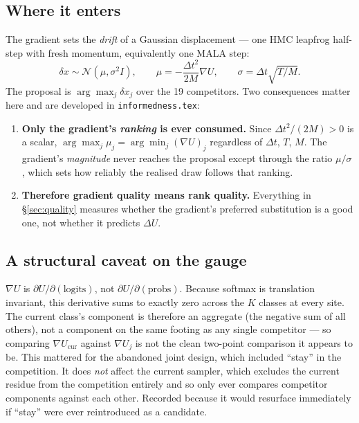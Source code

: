 \documentclass[11pt,a4paper]{article}
\newcommand{\dt}{\Delta t}
\newcommand{\gradU}{\nabla U}
\newcommand{\Mass}{M}
\begin{document}
\subsection{Where it enters}

The gradient sets the \emph{drift} of a Gaussian displacement --- one HMC
leapfrog half-step with fresh momentum, equivalently one MALA step:
\begin{equation}
  \delta x \sim \mathcal{N}(\mu, \sigma^{2}I),
  \qquad
  \mu = -\frac{\dt^{2}}{2\Mass}\gradU,
  \qquad
  \sigma = \dt\sqrt{T/\Mass}.
\end{equation}
The proposal is $\arg\max_{j}\delta x_{j}$ over the 19 competitors. Two
consequences matter here and are developed in \texttt{informedness.tex}:

\begin{enumerate}
  \item \textbf{Only the gradient's \emph{ranking} is ever consumed.} Since
        $\dt^{2}/(2\Mass)>0$ is a scalar, $\arg\max_{j}\mu_{j} =
        \arg\min_{j}(\gradU)_{j}$ regardless of $\dt$, $T$, $\Mass$. The
        gradient's \emph{magnitude} never reaches the proposal except through
        the ratio $\mu/\sigma$, which sets how reliably the realised draw
        follows that ranking.
  \item \textbf{Therefore gradient quality means rank quality.} Everything in
        \S\ref{sec:quality} measures whether the gradient's preferred
        substitution is a good one, not whether it predicts $\Delta U$.
\end{enumerate}

\subsection{A structural caveat on the gauge}

$\gradU$ is $\partial U/\partial(\text{logits})$, not
$\partial U/\partial(\text{probs})$. Because softmax is translation
invariant, this derivative sums to exactly zero across the $K$ classes at
every site. The current class's component is therefore an aggregate
(the negative sum of all others), not a component on the same footing as any
single competitor --- so comparing $\gradU_{\mathrm{cur}}$ against
$\gradU_{j}$ is not the clean two-point comparison it appears to be. This
mattered for the abandoned joint design, which included ``stay'' in the
competition. It does \emph{not} affect the current sampler, which excludes
the current residue from the competition entirely and so only ever compares
competitor components against each other. Recorded because it would resurface
immediately if ``stay'' were ever reintroduced as a candidate.
\end{document}
